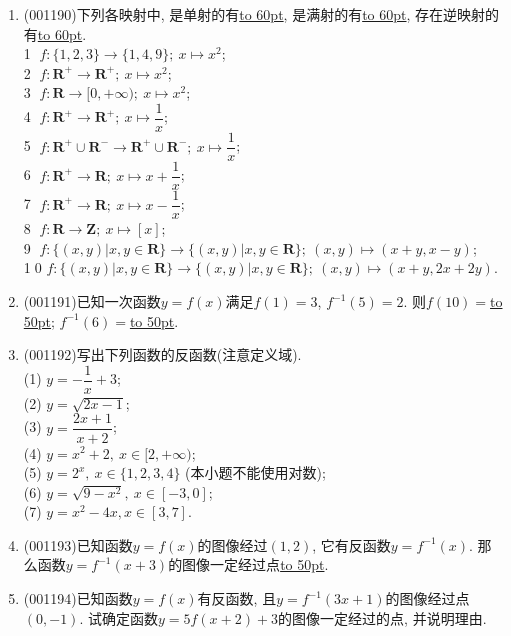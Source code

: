 \documentclass[10pt,a4paper]{article}
\newcommand{\blank}[1]{\underline{\hbox to #1pt{}}}
\begin{document}
\begin{enumerate}[1.]
\item {\tiny (001190)}下列各映射中, 是单射的有\blank{60}, 是满射的有\blank{60}, 存在逆映射的有\blank{60}.\\ 
\textcircled{1} $f: \{1,2,3\}\rightarrow \{1,4,9\}; \ x\mapsto x^2$;\\ 
\textcircled{2} $f: \mathbf{R}^+\rightarrow \mathbf{R}^+; \ x \mapsto x^2$;\\ 
\textcircled{3} $f: \mathbf{R}\rightarrow [0,+\infty); \ x \mapsto x^2$;\\ 
\textcircled{4} $f: \mathbf{R}^+\rightarrow \mathbf{R}^+; \ x \mapsto \dfrac{1}{x}$;\\ 
\textcircled{5} $f: \mathbf{R}^+\cup \mathbf{R}^-\rightarrow \mathbf{R}^+\cup \mathbf{R}^-; \ x \mapsto \dfrac{1}{x}$;\\ 
\textcircled{6} $f: \mathbf{R}^+\rightarrow \mathbf{R}; \ x \mapsto x+\dfrac{1}{x}$;\\ 
\textcircled{7} $f: \mathbf{R}^+\rightarrow \mathbf{R}; \ x \mapsto x-\dfrac{1}{x}$;\\ 
\textcircled{8} $f: \mathbf{R}\rightarrow \mathbf{Z}; \ x \mapsto [x]$;\\ 
\textcircled{9} $f: \{(x,y)|x,y\in \mathbf{R}\}\rightarrow \{(x,y)|x,y\in \mathbf{R}\};\ (x,y)\mapsto (x+y,x-y)$;\\ 
\textcircled{10} $f: \{(x,y)|x,y\in \mathbf{R}\}\rightarrow \{(x,y)|x,y\in \mathbf{R}\};\ (x,y)\mapsto (x+y,2x+2y)$.
\item {\tiny (001191)}已知一次函数$y=f(x)$满足$f(1)=3$, $f^{-1}(5)=2$. 则$f(10)=$\blank{50}; $f^{-1}(6)=$\blank{50}.
\item {\tiny (001192)}写出下列函数的反函数(注意定义域).\\ 
(1) $y=-\dfrac{1}{x}+3$;\\ 
(2) $y=\sqrt{2x-1}$;\\ 
(3) $y=\dfrac{2x+1}{x+2}$;\\ 
(4) $y=x^2+2, \ x\in [2,+\infty)$;\\ 
(5) $y=2^x, \ x\in \{1,2,3,4\}$ (本小题不能使用对数);\\ 
(6) $y=\sqrt{9-x^2}, \ x\in [-3,0]$;\\ 
(7) $y=x^2-4x, x \in [3,7]$.
\item {\tiny (001193)}已知函数$y=f(x)$的图像经过$(1,2)$, 它有反函数$y=f^{-1}(x)$. 那么函数$y=f^{-1}(x+3)$的图像一定经过点\blank{50}.
\item {\tiny (001194)}已知函数$y=f(x)$有反函数, 且$y=f^{-1}(3x+1)$的图像经过点$(0,-1)$. 试确定函数$y=5f(x+2)+3$的图像一定经过的点, 并说明理由.

\end{enumerate}
\end{document}
